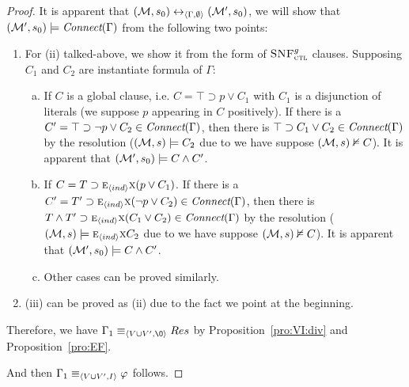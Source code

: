\documentclass[letterpaper]{article} %
\begin{document}
\begin{proof}
It is apparent that $({\cal M}, s_0) \leftrightarrow_{{\langle{\Gamma, \emptyset}\rangle}} ({\cal M}', s_0)$, we will show that $({\cal M}', s_0) \models \emph{Connect}(\Gamma)$ from the following two points:
\begin{enumerate}[(1)]
  \item For (ii) talked-above, we show it from the form of ${\textsc{SNF}_{\textsc{ctl}}^g}$ clauses. Supposing $C_1$ and $C_2$ are instantiate formula of $\Gamma$:
  \begin{enumerate}[(a)]
    \item If $C$ is a global clause, i.e. $C=\top \supset p \vee C_1$ with $C_1$ is a disjunction of literals (we suppose $p$ appearing in $C$ positively). If there is a $C'=\top \supset \neg p \vee C_2 \in \emph{Connect}(\Gamma)$, then there is $\top \supset C_1 \vee C_2 \in \emph{Connect}(\Gamma)$ by the resolution ($({\cal M},s) \models C_2$ due to we have suppose $({\cal M},s) \nvDash C$). It is apparent that $({\cal M}', s_0) \models C \wedge C'$.
    \item If $C = T \supset \textsc{e}_{{\langle{ind}\rangle}}\textsc{x} (p \vee C_1)$.
        If there is a $C'=T' \supset \textsc{e}_{{\langle{ind}\rangle}}\textsc{x}( \neg p \vee C_2) \in \emph{Connect}(\Gamma)$, then there is $T\wedge T' \supset \textsc{e}_{{\langle{ind}\rangle}}\textsc{x}(C_1 \vee C_2) \in \emph{Connect}(\Gamma)$  by the resolution ($({\cal M},s) \models \textsc{e}_{{\langle{ind}\rangle}}\textsc{x} C_2$ due to we have suppose $({\cal M},s) \nvDash C$). It is apparent that $({\cal M}', s_0) \models C \wedge C'$.
    \item Other cases can be proved similarly.
  \end{enumerate}

  \item (iii) can be proved as (ii) due to the fact we point at the beginning.
\end{enumerate}
Therefore, we have $\Gamma_1\equiv_{\tuple{V\cup V', {\O}}} Res$  by Proposition~\ref{pro:VI:div} and Proposition~\ref{pro:EF}.

And then $\Gamma_1 \equiv_{{\langle{V \cup V', I}\rangle}} \varphi$ follows.
\end{proof}
\end{document}
